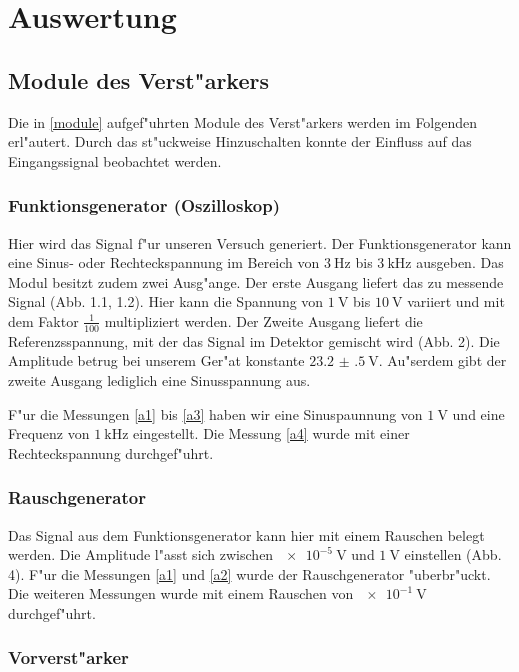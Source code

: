 \documentclass{scrartcl}
\begin{document}
	\section{Auswertung}

		\subsection{Module des Verst"arkers}

			Die in \ref{module} aufgef"uhrten Module des Verst"arkers werden im Folgenden erl"autert.
			Durch das st"uckweise Hinzuschalten konnte der Einfluss auf das Eingangssignal beobachtet werden.

			\subsubsection{Funktionsgenerator (Oszilloskop)}

				Hier wird das Signal f"ur unseren Versuch generiert.
				Der Funktionsgenerator kann eine Sinus- oder Rechteckspannung im Bereich von $\SI{3}{\hertz}$ bis $\SI{3}{\kilo\hertz}$ ausgeben.
				Das Modul besitzt zudem zwei Ausg"ange. Der erste Ausgang liefert das zu messende Signal (Abb. 1.1, 1.2).
				Hier kann die Spannung von $\SI{1}{\volt}$ bis $\SI{10}{\volt}$ variiert und mit dem Faktor $\frac{1}{100}$ multipliziert werden.
				Der Zweite Ausgang liefert die Referenzsspannung, mit der das Signal im Detektor gemischt wird (Abb. 2).
				Die Amplitude betrug bei unserem Ger"at konstante $\SI{23.2(5)}{\volt}$.
				Au"serdem gibt der zweite Ausgang lediglich eine Sinusspannung aus.

				F"ur die Messungen \ref{a1} bis \ref{a3} haben wir eine Sinuspaunnung von $\SI{1}{\volt}$ und eine Frequenz von $\SI{1}{\kilo\hertz}$ eingestellt.
				Die Messung \ref{a4} wurde mit einer Rechteckspannung durchgef"uhrt.

			\subsubsection{Rauschgenerator}

				Das Signal aus dem Funktionsgenerator kann hier mit einem Rauschen belegt werden.
				Die Amplitude l"asst sich zwischen $\SI{e-5}{\volt}$ und $\SI{1}{\volt}$ einstellen (Abb. 4).
				F"ur die Messungen \ref{a1} und \ref{a2} wurde der Rauschgenerator "uberbr"uckt. Die weiteren Messungen wurde mit einem Rauschen von $\SI{e-1}{\volt}$ durchgef"uhrt.

			\subsubsection{Vorverst"arker}
\end{document}
